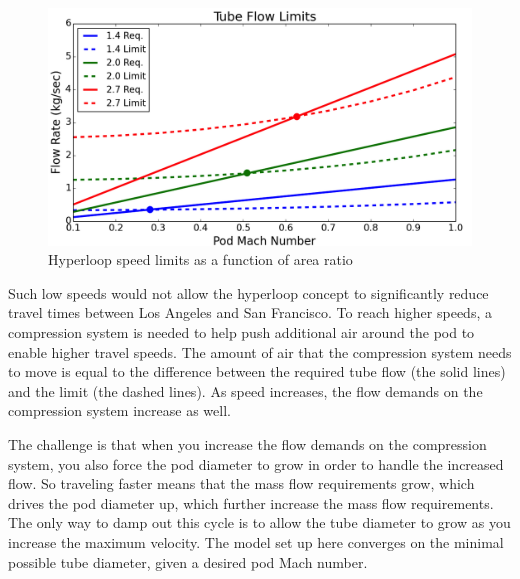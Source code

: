 \documentclass[heading.tex]{subfiles}
\begin{document}
\begin{figure}[hbtp]
\centering
\includegraphics[width=\textwidth]{images/tube_flow_limit2.png}
\caption{Hyperloop speed limits as a function of area ratio}
\label{f:flowLIMIT}
\end{figure}

Such low speeds would not allow the hyperloop concept to significantly reduce travel times between Los Angeles and San Francisco. To
reach higher speeds, a compression system is needed to help push additional air around the pod to enable higher travel speeds. The amount
of air that the compression system needs to move is equal to the difference between the required tube flow (the solid lines) and the limit
(the dashed lines). As speed increases, the flow demands on the compression system increase as well.

The challenge is that when you increase the flow demands on the compression system, you also force the pod diameter to grow in order to
handle the increased flow. So traveling faster means that the mass flow requirements grow, which drives the pod diameter up, which further
increase the mass flow requirements. The only way to damp out this cycle is to allow the tube diameter to grow as you increase the
maximum velocity. The model set up here converges on the minimal possible tube diameter, given a desired pod Mach number.
\end{document}
